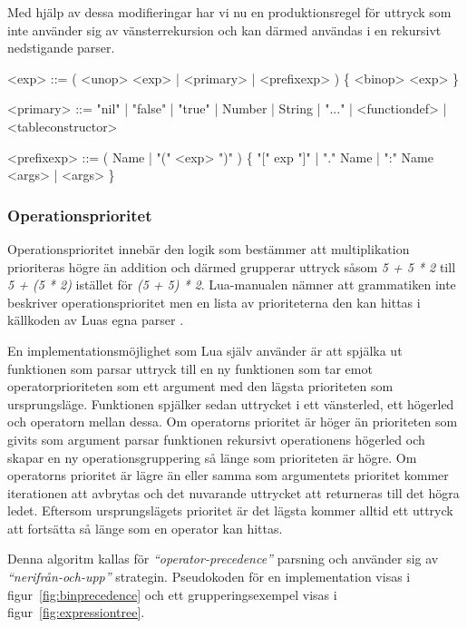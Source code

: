 Med hjälp av dessa modifieringar har vi nu en produktionsregel för uttryck som
inte använder sig av vänsterrekursion och kan därmed användas i en rekursivt
nedstigande parser.

\setlength{\grammarindent}{6em}
\begin{grammar}
  \singlespace\small%
  \selectfont
  <exp> ::= ( <unop> <exp> | <primary> | <prefixexp> ) \{ <binop> <exp> \}

  <primary> ::= "nil" | "false" | "true" | Number | String | "..." |
      <functiondef> | <tableconstructor>

  <prefixexp> ::= ( Name | "(" <exp> ")" ) \{ "[" exp "]" | "." Name |
      ":" Name <args> | <args> \}
\end{grammar}

\subsubsection{Operationsprioritet}

Operationsprioritet innebär den logik som bestämmer att multiplikation
prioriteras högre än addition och därmed grupperar uttryck såsom \textit{5 + 5
* 2} till \textit{5 + (5 * 2)} istället för \textit{(5 + 5) * 2}. Lua-manualen
nämner att grammatiken inte beskriver operationsprioritet \citep{luaref} men
en lista av prioriteterna den kan hittas i källkoden av Luas egna parser
\citep{lparse}.

En implementationsmöjlighet som Lua själv använder är att spjälka ut
funktionen som parsar uttryck till en ny funktionen som tar emot
operatorprioriteten som ett argument med den lägsta prioriteten som
ursprungsläge. Funktionen spjälker sedan uttrycket i ett vänsterled, ett
högerled och operatorn mellan dessa. Om operatorns prioritet är höger än
prioriteten som givits som argument parsar funktionen rekursivt operationens
högerled och skapar en ny operationsgruppering så länge som prioriteten är
högre. Om operatorns prioritet är lägre än eller samma som argumentets
prioritet kommer iterationen att avbrytas och det nuvarande uttrycket att
returneras till det högra ledet. Eftersom ursprungslägets prioritet är det
lägsta kommer alltid ett uttryck att fortsätta så länge som en operator kan
hittas.

Denna algoritm kallas för \textit{``operator-precedence''} parsning och
använder sig av \textit{``nerifrån-och-upp''} strategin. Pseudokoden för en
implementation visas i figur~\ref{fig:binprecedence} och ett
grupperingsexempel visas i figur~\ref{fig:expressiontree}.

